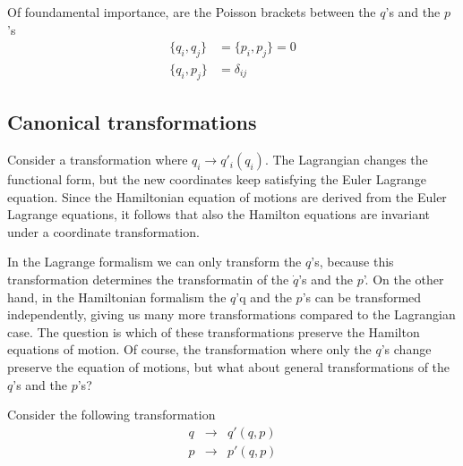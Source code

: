 \documentclass[11pt,fleqn]{book} %
\begin{document}
Of foundamental importance, are the Poisson brackets between the $q$'s and the $p$'s
\begin{equation}
    \label{eq:canonical_poisson_brackets}
    \begin{split}
        \{q_i,q_j\} &= \{p_i,p_j\}=0\\
        \{q_i,p_j\} &= \delta_{ij}
    \end{split}
\end{equation}

\subsection{Canonical transformations}
Consider a transformation where $q_i\to q'_i(q_i)$. The Lagrangian changes the functional form, but the new coordinates keep satisfying the
Euler Lagrange equation. Since the Hamiltonian equation of motions are derived from the Euler Lagrange equations, it follows that also the
Hamilton equations are invariant under a coordinate transformation. 

In the Lagrange formalism we can only transform the $q$'s, because this transformation determines the transformatin of the $\dot q$'s and the $p$'.
On the other hand, in the Hamiltonian formalism the $q$'q and the $p$'s can be transformed independently, giving us many more transformations compared to
the Lagrangian case. The question is which of these transformations preserve the Hamilton equations of motion. Of course, the transformation where
only the $q$'s change preserve the equation of motions, but what about general transformations of the $q$'s and the $p$'s?

Consider the following transformation
\begin{eqnarray*}
    q&\to&q'(q,p) \\
    p&\to&p'(q,p)
\end{eqnarray*}
\end{document}
